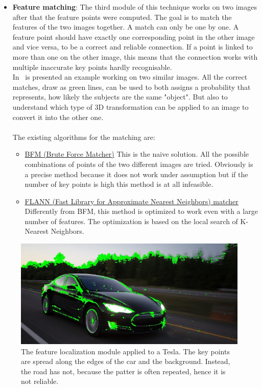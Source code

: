 \begin{itemize}
	\item \textbf{Feature matching}: The third module of this technique works on two images after that the feature points were computed. The goal is to match the features of the two images together. A match can only be one by one. A feature point should have exactly one corresponding point in the other image and vice versa, to be a correct and reliable connection. If a point is linked to more than one on the other image, this means that the connection works with multiple inaccurate key points hardly recognisable.\\
	In~ is presented an example working on two similar images. All the correct matches, draw as green lines, can be used to both assigns a probability that represents, how likely the subjects are the same "object". But also to understand which type of 3D transformation can be applied to an image to convert it into the other one.\\
	\\
	The existing algorithms for the matching are:
	\begin{itemize}
		\item \underline{BFM (Brute Force Matcher)} This is the naive solution. All the possible combinations of points of the two different images are tried. Obviously is a precise method because it does not work under assumption but if the number of key points is high this method is at all infeasible.
		\item \underline{FLANN (Fast Library for Approximate Nearest Neighbors) matcher}\cite{flann} Differently from BFM, this method is optimized to work even with a large number of features. The optimization is based on the local search of K-Nearest Neighbors.
	\end{itemize}
\end{itemize}
\begin{figure}[!h]
	\centering
	\includegraphics[width=0.7\linewidth]{images/recognition/kpMatch_tesla}
	\captionsetup{margin=0.5cm}
	\caption[Key points localization on a Tesla.]{The feature localization module applied to a Tesla. The key points are spread along the edges of the car and the background. Instead, the road has not, because the patter is often repeated, hence it is not reliable.}
	\label{fig:kpMatch_tesla}
\end{figure}
